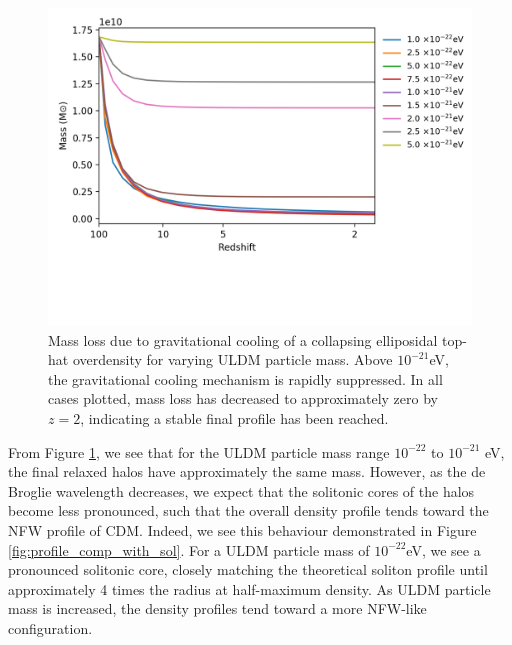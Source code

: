 \documentclass[a4paper,11pt]{article}
\begin{document}
\begin{figure}[!htb]
    \centering
  \includegraphics[trim={0cm 3cm 2cm 0cm},scale=0.8]{mass_loss_ULDM_mass.png}
  \caption{Mass loss due to gravitational cooling of a collapsing elliposidal top-hat overdensity for varying ULDM particle mass. Above $10^{-21}$eV, the gravitational cooling mechanism is rapidly suppressed. In all cases plotted, mass loss has decreased to approximately zero by $z=2$, indicating a stable final profile has been reached.}\label{fig:mass_loss_ULDM_mass}
\end{figure}

From Figure \ref{fig:mass_loss_ULDM_mass}, we see that for the ULDM particle mass range $10^{-22}$ to $10^{-21}$ eV, the final relaxed halos have approximately the same mass. However, as the de Broglie wavelength decreases, we expect that the solitonic cores of the halos become less pronounced, such that the overall density profile tends toward the NFW profile of CDM. Indeed, we see this behaviour demonstrated in Figure \ref{fig:profile_comp_with_sol}. For a ULDM particle mass of $10^{-22}$eV, we see a pronounced solitonic core, closely matching the theoretical soliton profile until approximately 4 times the radius at half-maximum density. As ULDM particle mass is increased, the density profiles tend toward a more NFW-like configuration. 
\end{document}
